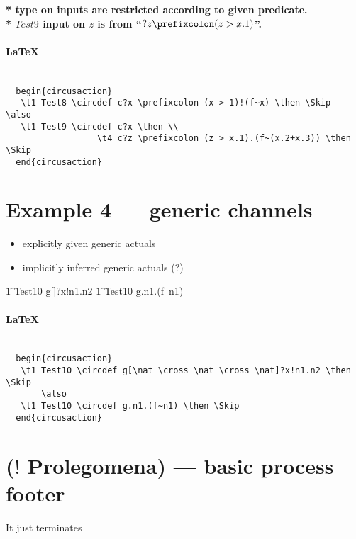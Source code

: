 \documentclass{article}
\begin{document}
\textbf{* type on inputs are restricted according to given predicate.}
\\
\indent \textbf{* $Test9$ input on $z$ is from ``$?z \prefixcolon (z > x.1)$''.}

\paragraph{\LaTeX\\ \\}

\begin{verbatim}
  begin{circusaction}
   \t1 Test8 \circdef c?x \prefixcolon (x > 1)!(f~x) \then \Skip
\also
   \t1 Test9 \circdef c?x \then \\
                  \t4 c?z \prefixcolon (z > x.1).(f~(x.2+x.3)) \then \Skip
  end{circusaction}
\end{verbatim}

\newpage
\section{Example 4 --- generic channels}

\begin{itemize}
   \item explicitly given generic actuals
   \item implicitly inferred generic actuals (?)
\end{itemize}

\begin{circusaction}
   \t1 Test10 \circdef g[\nat \cross \nat \cross \nat]?x!n1.n2 \then \Skip
        \also
   \t1 Test10 \circdef g.n1.(f~n1) \then \Skip
\end{circusaction}

\paragraph{\LaTeX\\ \\}

\begin{verbatim}
  begin{circusaction}
   \t1 Test10 \circdef g[\nat \cross \nat \cross \nat]?x!n1.n2 \then \Skip
       \also
   \t1 Test10 \circdef g.n1.(f~n1) \then \Skip
  end{circusaction}
\end{verbatim}


\newpage
\section{($!$ Prolegomena) --- basic process footer}

It just terminates

\begin{circusaction}
   \circspot \Skip
\end{circusaction}

\begin{circus}
   \circend
\end{circus}
\end{document}
